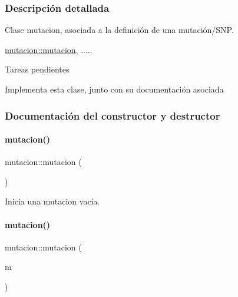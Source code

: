 \subsubsection{Descripción detallada}
Clase mutacion, asociada a la definición de una mutación/\+S\+NP. 

\hyperlink{classmutacion_a01cb8b2307eacbfb415f99373ff3c64a}{mutacion\+::mutacion}, .....

\begin{DoxyRefDesc}{Tareas pendientes}
\item[\hyperlink{todo__todo000002}{Tareas pendientes}]Implementa esta clase, junto con su documentación asociada\end{DoxyRefDesc}


\subsubsection{Documentación del constructor y destructor}
\hypertarget{classmutacion_a01cb8b2307eacbfb415f99373ff3c64a}{}\label{classmutacion_a01cb8b2307eacbfb415f99373ff3c64a} 
\paragraph{\texorpdfstring{mutacion()}{mutacion()}\hspace{0.1cm}{\footnotesize\ttfamily [1/3]}}
{\footnotesize\ttfamily mutacion\+::mutacion (\begin{DoxyParamCaption}{ }\end{DoxyParamCaption})}



Inicia una mutacion vacía. 

\hypertarget{classmutacion_a6bcb17c723a359ffac7dda8d5d427dfe}{}\label{classmutacion_a6bcb17c723a359ffac7dda8d5d427dfe} 
\paragraph{\texorpdfstring{mutacion()}{mutacion()}\hspace{0.1cm}{\footnotesize\ttfamily [2/3]}}
{\footnotesize\ttfamily mutacion\+::mutacion (\begin{DoxyParamCaption}\item[{const \hyperlink{classmutacion}{mutacion} \&}]{m }\end{DoxyParamCaption})}



